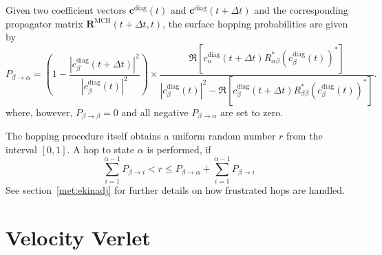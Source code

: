 \documentclass[a4paper,11pt,DIV=15,openany,twoside=false]{scrbook}
\newcommand{\VEC}[1]{\ensuremath{\mathbf{#1}}}
\begin{document}
Given two coefficient vectors $\VEC{c}^{\text{diag}}(t)$ and $\VEC{c}^{\text{diag}}(t+\Delta t)$ and the corresponding propagator matrix $\VEC{R}^{\text{MCH}}(t+\Delta t,t)$, the surface hopping probabilities are given by
\begin{equation}
  P_{\beta\rightarrow\alpha}=
  \left(
    1-
    \frac{
      \left|
        c_\beta^{\text{diag}}(t+\Delta t)
      \right|^2
    }{
      \left|
        c_\beta^{\text{diag}}(t)
      \right|^2
    }\right)
    \times
    \frac{
      \Re\left[
        c^{\text{diag}}_\alpha(t+\Delta t)
        R^*_{\alpha\beta}
        \left(
          c^{\text{diag}}_\beta(t)
        \right)^*
      \right]
    }{
      \left|
        c^{\text{diag}}_\beta(t)
      \right|^2
      -\Re\left[
        c^{\text{diag}}_\beta(t+\Delta t)
        R^*_{\beta\beta}
        \left(
          c^{\text{diag}}_\beta(t)
        \right)^*
      \right]
    }.
\end{equation}
where, however, $P_{\beta\rightarrow\beta}=0$ and all negative $P_{\beta\rightarrow\alpha}$ are set to zero.

The hopping procedure itself obtains a uniform random number $r$ from the interval $[0,1]$. A hop to state $\alpha$ is performed, if
\begin{equation}
  \sum\limits_{i=1}^{\alpha-1} P_{\beta\rightarrow i} < r \le P_{\beta\rightarrow\alpha}+\sum\limits_{i=1}^{\alpha-1} P_{\beta\rightarrow i}
\end{equation}
See section~\ref{met:ekinadj} for further details on how frustrated hops are handled.


\section{Velocity Verlet}
\end{document}
